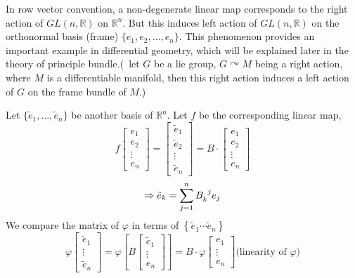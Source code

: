 \begin{remark}[Important!]
    In row vector convention, a non-degenerate linear map corresponds to the right action of $GL(n,\mathbb{R})$ on $\mathbb{R}^n$. But this induces left action of $GL(n,\mathbb{R})$ on the orthonormal basis (frame) $\{e_1,e_2,\ldots,e_n\}$. This phenomenon provides an important example in differential geometry, which will be explained later in the theory of principle bundle.(\ie\ let $G$ be a lie group, $G\curvearrowright M$ being a right action, where $M$ is a differentiable manifold, then this right action induces a left action of $G$ on the frame bundle of $M$.)
 \end{remark}
 
 
 Let $\{\tilde{e}_1,\ldots,\tilde{e}_n\}$ be another basis of $\mathbb{R}^n$. Let $f$ be the corresponding linear map, \ie\
 \[f\begin{bmatrix}
    e_1\\
    e_2\\
    \vdots\\
    e_n
\end{bmatrix}=\begin{bmatrix}
    \tilde{e}_1\\
    \tilde{e}_2\\
    \vdots\\
    \tilde{e}_n
\end{bmatrix}=B \cdot \begin{bmatrix}
    e_1\\
    e_2\\
    \vdots\\
    e_n
\end{bmatrix}\]
\[\Rightarrow \tilde{e}_k=\sum_{j=1}^n B\indices{_k^j}e_j\]
We compare the matrix of $\varphi$ in terms of $\left\{\tilde{e}_1 \cdots \tilde{e}_n\right\}$
\[
    \varphi\left[\begin{array}{c}\tilde{e}_1 \\ \vdots \\ \tilde{e}_n\end{array}\right]=\varphi\left[B\left[\begin{array}{c}\tilde{e}_1 \\ \vdots \\ e_n\end{array}\right]\right]=B \cdot \varphi\left[\begin{array}{c}e_1 \\ \vdots \\ e_n\end{array}\right]\text{(linearity of }\varphi\text{)}
\]
